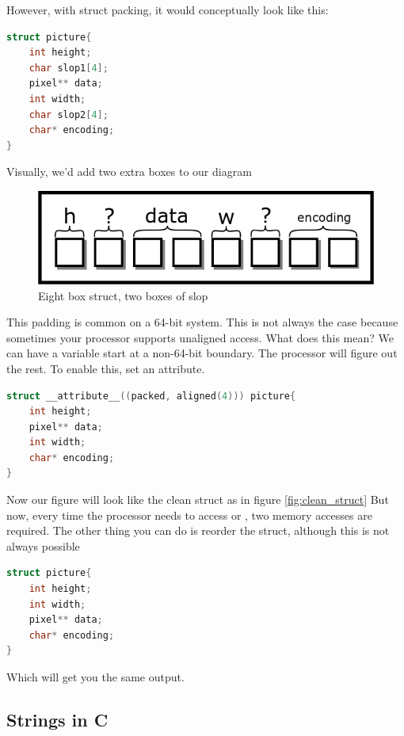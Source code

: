 However, with struct packing, it would conceptually look like this:

\begin{lstlisting}[language=C]
struct picture{
    int height;
    char slop1[4];
    pixel** data;
    int width;
    char slop2[4];
    char* encoding;
}
\end{lstlisting}

Visually, we'd add two extra boxes to our diagram

\begin{figure}[H]
\centering
\includegraphics[width=.7\textwidth]{introc/drawings/struct_slop.png}
\caption{Eight box struct, two boxes of slop}
\label{fig:sloppy_struct}
\end{figure}

This padding is common on a 64-bit system.
This is not always the case because sometimes your processor supports unaligned access.
What does this mean?
We can have a variable start at a non-64-bit boundary.
The processor will figure out the rest.
To enable this, set an attribute.

\begin{lstlisting}[language=C]
struct __attribute__((packed, aligned(4))) picture{
    int height;
    pixel** data;
    int width;
    char* encoding;
}
\end{lstlisting}

Now our figure will look like the clean struct as in figure  \ref{fig:clean_struct}
But now, every time the processor needs to access  or ,
two memory accesses are required.
The other thing you can do is reorder the struct, although this is not always possible

\begin{lstlisting}[language=C]
struct picture{
    int height;
    int width;
    pixel** data;
    char* encoding;
}
\end{lstlisting}

Which will get you the same output.

\subsection{Strings in C}

